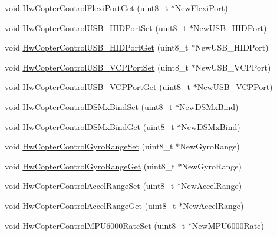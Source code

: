 \begin{DoxyCompactItemize}
\item 
void \hyperlink{group___hw_copter_control_ga6b19f9ec9693f58370edd5f2e7d40afc}{\-Hw\-Copter\-Control\-Flexi\-Port\-Get} (uint8\-\_\-t $\ast$\-New\-Flexi\-Port)
\item 
void \hyperlink{group___hw_copter_control_ga735932e4a2688c32953cd05d6001c75c}{\-Hw\-Copter\-Control\-U\-S\-B\-\_\-\-H\-I\-D\-Port\-Set} (uint8\-\_\-t $\ast$\-New\-U\-S\-B\-\_\-\-H\-I\-D\-Port)
\item 
void \hyperlink{group___hw_copter_control_gae9c385e9941d7c2f184deba8ca87d473}{\-Hw\-Copter\-Control\-U\-S\-B\-\_\-\-H\-I\-D\-Port\-Get} (uint8\-\_\-t $\ast$\-New\-U\-S\-B\-\_\-\-H\-I\-D\-Port)
\item 
void \hyperlink{group___hw_copter_control_ga56b4c7ce38afbf857b660d744617e35a}{\-Hw\-Copter\-Control\-U\-S\-B\-\_\-\-V\-C\-P\-Port\-Set} (uint8\-\_\-t $\ast$\-New\-U\-S\-B\-\_\-\-V\-C\-P\-Port)
\item 
void \hyperlink{group___hw_copter_control_ga64966b2a7307aa9a071ddc61d37cb409}{\-Hw\-Copter\-Control\-U\-S\-B\-\_\-\-V\-C\-P\-Port\-Get} (uint8\-\_\-t $\ast$\-New\-U\-S\-B\-\_\-\-V\-C\-P\-Port)
\item 
void \hyperlink{group___hw_copter_control_gaebe1246ae9bfd1b979ab47c48dd92a9c}{\-Hw\-Copter\-Control\-D\-S\-Mx\-Bind\-Set} (uint8\-\_\-t $\ast$\-New\-D\-S\-Mx\-Bind)
\item 
void \hyperlink{group___hw_copter_control_ga39c92d526b82424330b8458a6968e58b}{\-Hw\-Copter\-Control\-D\-S\-Mx\-Bind\-Get} (uint8\-\_\-t $\ast$\-New\-D\-S\-Mx\-Bind)
\item 
void \hyperlink{group___hw_copter_control_ga82a95dfacc1ea86d4b3a22180f302833}{\-Hw\-Copter\-Control\-Gyro\-Range\-Set} (uint8\-\_\-t $\ast$\-New\-Gyro\-Range)
\item 
void \hyperlink{group___hw_copter_control_ga6c57cc3f1228af03a32a9bf62c5d155b}{\-Hw\-Copter\-Control\-Gyro\-Range\-Get} (uint8\-\_\-t $\ast$\-New\-Gyro\-Range)
\item 
void \hyperlink{group___hw_copter_control_gaa8ed445f0402845d576b572993b8edec}{\-Hw\-Copter\-Control\-Accel\-Range\-Set} (uint8\-\_\-t $\ast$\-New\-Accel\-Range)
\item 
void \hyperlink{group___hw_copter_control_gada6cd52bea930a1e0a52f53a4a8af1f7}{\-Hw\-Copter\-Control\-Accel\-Range\-Get} (uint8\-\_\-t $\ast$\-New\-Accel\-Range)
\item 
void \hyperlink{group___hw_copter_control_ga02fbf5b377164ad421ae4062f9ef490e}{\-Hw\-Copter\-Control\-M\-P\-U6000\-Rate\-Set} (uint8\-\_\-t $\ast$\-New\-M\-P\-U6000\-Rate)

\end{DoxyCompactItemize}
